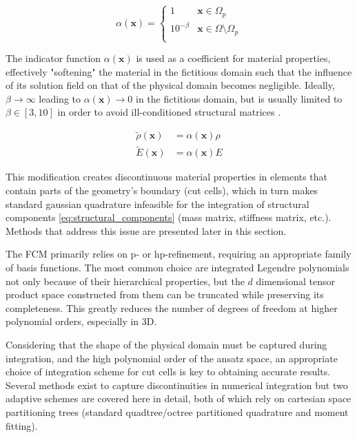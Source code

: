 \begin{equation} \label{eq:indicator_function}
	\alpha (\mathbf x) = \left\{
	\begin{array}{ll}
		1 & \mathbf x \in \Omega_p \\
		10^{-\beta} & \mathbf x \in \Omega \setminus \Omega_p \\
	\end{array}
	\right.
\end{equation}


The indicator function $\alpha(\mathbf x)$ is used as a coefficient for material properties, effectively "softening" the material in the fictitious domain such that the influence of its solution field on that of the physical domain becomes negligible.
Ideally, $\beta \to \infty$ leading to $\alpha (\mathbf x) \to 0$ in the fictitious domain, but is usually limited to $\beta \in [3,10]$ in order to avoid ill-conditioned structural matrices \cite{Jamshid2007}.

\begin{equation} \label{eq:fictitious_material_properties}
	\begin{array}{ll}
	\tilde \rho (\mathbf x) &= \alpha (\mathbf x) \rho \\
	\tilde E(\mathbf x) &= \alpha (\mathbf x) E
	\end{array}
\end{equation}

This modification creates discontinuous material properties in
elements that contain parts of the geometry's boundary (cut cells), which
in turn makes standard gaussian quadrature infeasible for the integration
of structural components \ref{eq:structural_components} (mass matrix, stiffness matrix, etc.). Methods that address this issue are presented later in this section.

The FCM primarily relies on p- or hp-refinement, requiring an appropriate family of basis functions. The most common choice are integrated Legendre polynomials \cite{Duester2007} not only because of their hierarchical properties, but the $d$ dimensional tensor product space constructed from them can be truncated while preserving its completeness. This greatly reduces the number of degrees of freedom at higher polynomial orders, especially in 3D.

Considering that the shape of the physical domain must be captured during integration, and the high polynomial order of the ansatz space, an appropriate choice of integration scheme for cut cells is key to obtaining accurate results. Several methods exist
to capture discontinuities in numerical integration but two adaptive schemes are covered here in detail,
both of which rely on cartesian space partitioning trees (standard quadtree/octree partitioned
quadrature and moment fitting).

